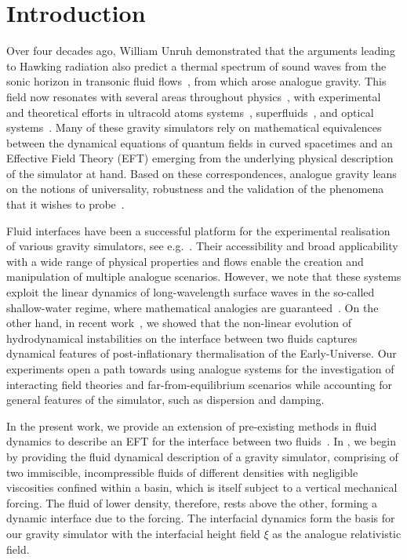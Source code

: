 \documentclass[a4paper]{jpconf}
\begin{document}
\section{Introduction}
Over four decades ago, William Unruh demonstrated that the arguments leading to Hawking radiation also predict a thermal spectrum of sound waves from the sonic horizon in transonic fluid flows~\cite{1981UnruhAnalogueGravity}, from which arose analogue gravity. This field now resonates with several areas throughout physics~\cite{barcelo2011analogue,jacquet2020next}, with experimental and theoretical efforts in ultracold atoms systems~\cite{Gooding:2020scc,Unruh:2022gso}, superfluids~\cite{bunney2023third}, and optical systems~\cite{Belgiorno2010HawkingFilaments,Philbin2008Fiber-opticalHorizon}. Many of these gravity simulators rely on mathematical equivalences between the dynamical equations of quantum fields in curved spacetimes and an Effective Field Theory (EFT) emerging from the underlying physical description of the simulator at hand. Based on these correspondences, analogue gravity leans on the notions of universality, robustness and the validation of the phenomena that it wishes to probe~\cite{jacquet2020next}. 

Fluid interfaces have been a successful platform for the experimental realisation of various gravity simulators, see e.g.~\cite{Rousseaux2008ObservationEffect,Weinfurtner2011MeasurementSystem, Torres2017RotationalFlow,Torres20QNM}. Their accessibility and broad applicability with a wide range of physical properties and flows enable the creation and manipulation of multiple analogue scenarios. However, we note that these systems exploit the linear dynamics of long-wavelength surface waves in the so-called shallow-water regime, where mathematical analogies are guaranteed~\cite{schutzhold2002gravity}. On the other hand, in recent work~\cite{barroso2022primary}, we showed that the non-linear evolution of hydrodynamical instabilities on the interface between two fluids captures dynamical features of post-inflationary thermalisation of the Early-Universe. Our experiments open a path towards using analogue systems for the investigation of interacting field theories and far-from-equilibrium scenarios while accounting for general features of the simulator, such as dispersion and damping. 

In the present work, we provide an extension of pre-existing methods in fluid dynamics to describe an EFT for the interface between two fluids~\cite{barroso2022primary}. In , we begin by providing the fluid dynamical description of a gravity simulator, comprising of two immiscible, incompressible fluids of different densities with negligible viscosities confined within a basin, which is itself subject to a vertical mechanical forcing. The fluid of lower density, therefore, rests above the other, forming a dynamic interface due to the forcing. The interfacial dynamics form the basis for our gravity simulator with the interfacial height field $\xi$ as the analogue relativistic field.
\end{document}
